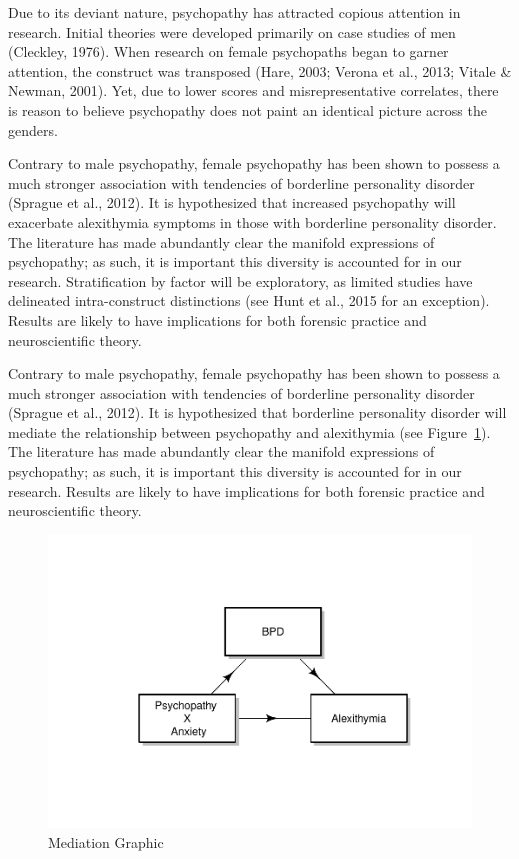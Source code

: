 \documentclass[
  man,floatsintext]{apa7}
\begin{document}
Due to its deviant nature, psychopathy has attracted copious attention in research. Initial theories were developed primarily on case studies of men (Cleckley, 1976). When research on female psychopaths began to garner attention, the construct was transposed (Hare, 2003; Verona et al., 2013; Vitale \& Newman, 2001). Yet, due to lower scores and misrepresentative correlates, there is reason to believe psychopathy does not paint an identical picture across the genders.

Contrary to male psychopathy, female psychopathy has been shown to possess a much stronger association with tendencies of borderline personality disorder (Sprague et al., 2012). It is hypothesized that increased psychopathy will exacerbate alexithymia symptoms in those with borderline personality disorder. The literature has made abundantly clear the manifold expressions of psychopathy; as such, it is important this diversity is accounted for in our research. Stratification by factor will be exploratory, as limited studies have delineated intra-construct distinctions (see Hunt et al., 2015 for an exception). Results are likely to have implications for both forensic practice and neuroscientific theory.

Contrary to male psychopathy, female psychopathy has been shown to possess a much stronger association with tendencies of borderline personality disorder (Sprague et al., 2012). It is hypothesized that borderline personality disorder will mediate the relationship between psychopathy and alexithymia (see Figure~\ref{fig:mediation-graphic}). The literature has made abundantly clear the manifold expressions of psychopathy; as such, it is important this diversity is accounted for in our research. Results are likely to have implications for both forensic practice and neuroscientific theory.

\begin{figure}
\includegraphics[width=1\linewidth]{d2m-Psychopathy_files/figure-latex/mediation-graphic-1} \caption{Mediation Graphic}\label{fig:mediation-graphic}
\end{figure}
\end{document}
